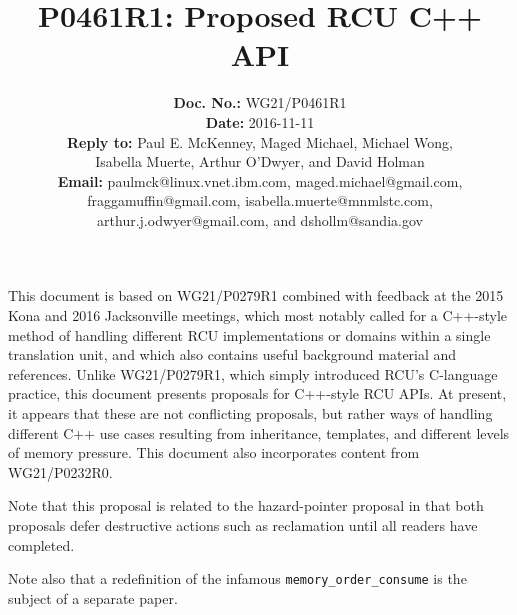 \documentclass[letterpaper,10pt]{article}
\begin{document}
\newcommand{\co}[1]{\lstinline[breaklines=yes,breakatwhitespace=yes]{#1}}

\title{P0461R1: Proposed RCU C++ API}

\author{
{\bf Doc. No.: } WG21/P0461R1 \\
{\bf Date: } 2016-11-11 \\
{\bf Reply to: } Paul E. McKenney, Maged Michael, Michael Wong,\\
Isabella Muerte, Arthur O'Dwyer, and David Holman \\
{\bf Email: } paulmck@linux.vnet.ibm.com, maged.michael@gmail.com, \\
fraggamuffin@gmail.com, isabella.muerte@mnmlstc.com, \\
arthur.j.odwyer@gmail.com, and dshollm@sandia.gov
} %


\pagestyle{myheadings}

\maketitle


This document is based on WG21/P0279R1 combined with feedback at
the 2015 Kona and 2016 Jacksonville meetings, which most notably called
for a C++-style method of handling different RCU implementations or
domains within a single translation unit, and which also contains
useful background material and references.
Unlike WG21/P0279R1, which simply introduced RCU's C-language practice,
this document presents proposals for C++-style RCU APIs.
At present, it appears that these are not conflicting proposals, but
rather ways of handling different C++ use cases resulting from
inheritance, templates, and different levels of memory pressure.
This document also incorporates content from
WG21/P0232R0\cite{PaulEMcKennneyToolKitP0232R0}.

Note that this proposal is related to the hazard-pointer proposal in
that both proposals defer destructive actions such as reclamation until
all readers have completed.

Note also that a redefinition of the infamous \co{memory_order_consume}
is the subject of a separate paper.
\end{document}
